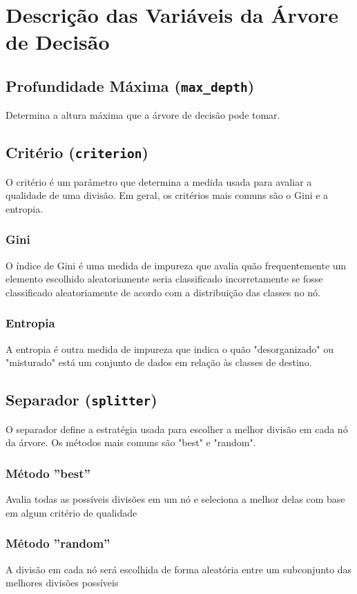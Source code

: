 \documentclass[a4paper,11pt]{article}
\begin{document}
\section{Descrição das Variáveis da Árvore de Decisão}
\subsection{Profundidade Máxima (\texttt{max\_depth})}

Determina a altura máxima que a árvore de decisão pode tomar.

\subsection{Critério (\texttt{criterion})}
O critério é um parâmetro que determina a medida usada para avaliar a qualidade de uma divisão. Em geral, os critérios mais comuns são o Gini e a entropia.

\subsubsection{Gini}
O índice de Gini é uma medida de impureza que avalia quão frequentemente um elemento escolhido aleatoriamente seria classificado incorretamente se fosse classificado aleatoriamente de acordo com a distribuição das classes no nó.

\subsubsection{Entropia}
A entropia é outra medida de impureza que indica o quão "desorganizado" ou "misturado" está um conjunto de dados em relação às classes de destino.

\subsection{Separador (\texttt{splitter})}
O separador define a estratégia usada para escolher a melhor divisão em cada nó da árvore. Os métodos mais comuns são "best" e "random".

\subsubsection{Método ''best''}
Avalia todas as possíveis divisões em um nó e seleciona a melhor delas com base em algum critério de qualidade

\subsubsection{Método ''random''}
A divisão em cada nó será escolhida de forma aleatória entre um subconjunto das melhores divisões possíveis
\end{document}
